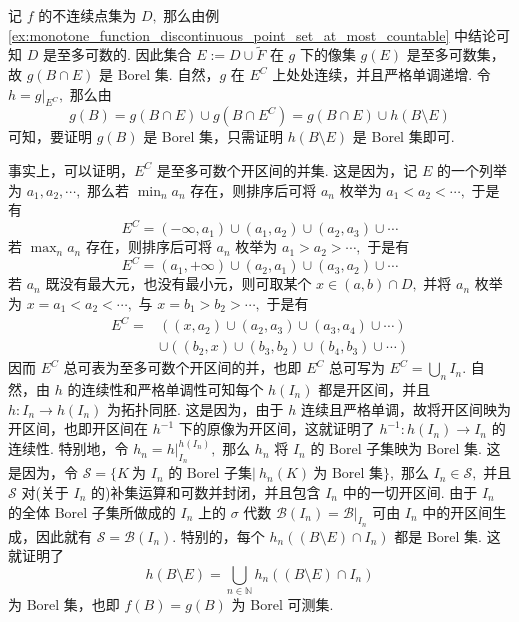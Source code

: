\documentclass[12pt, a4paper, oneside]{book}
\numberwithin{figure}{section}
\theoremstyle{definition}
\begin{document}
记 $f$ 的不连续点集为 $D,$ 那么由例 \ref{ex:monotone_function_discontinuous_point_set_at_most_countable} 中结论可知 $D$ 是至多可数的. 
因此集合 $E:=D\cup \tilde F$ 在 $g$ 下的像集 $g(E)$ 是至多可数集，故 $g(B\cap E)$ 是 Borel 集. 自然，$g$ 在 $E^C$ 上处处连续，并且严格单调递增. 令 $h=g|_{E^C},$ 那么由
\begin{equation}
    g(B) = g(B\cap E)\cup g(B\cap E^C) = g(B\cap E)\cup h(B\setminus E)
\end{equation}
可知，要证明 $g(B)$ 是 Borel 集，只需证明 $h(B\setminus E)$ 是 Borel 集即可. 

事实上，可以证明，$E^C$ 是至多可数个开区间的并集. 这是因为，记 $E$ 的一个列举为 $a_1,a_2,\cdots,$ 那么若 
$\min_n a_n$ 存在，则排序后可将 $a_n$ 枚举为 $a_1<a_2<\cdots,$ 于是有 
\begin{equation}
    E^C =  (-\infty,a_1)\cup (a_1,a_2)\cup (a_2,a_3)\cup \cdots
\end{equation}
若 $\max_n a_n$ 存在，则排序后可将 $a_n$ 枚举为 $a_1>a_2>\cdots,$ 于是有
\begin{equation}
    E^C =  (a_1,+\infty)\cup (a_2,a_1)\cup (a_3,a_2)\cup\cdots
\end{equation}
若 $a_n$ 既没有最大元，也没有最小元，则可取某个 $x\in (a,b)\cap D,$ 并将 $a_n$ 枚举为 $x=a_1<a_2<\cdots,$ 与 $x=b_1>b_2>\cdots,$ 于是有
\begin{equation}
    \begin{aligned}
        E^C =& \left( (x,a_2)\cup (a_2,a_3)\cup (a_3,a_4)\cup\cdots\right) \\
        &\cup \left( (b_2,x)\cup (b_3,b_2)\cup (b_4,b_3)\cup\cdots\right)
    \end{aligned}
\end{equation}
因而 $E^C$ 总可表为至多可数个开区间的并，也即 $E^C$ 总可写为 $E^C=\bigcup_n I_n.$ 自然，由 $h$ 的连续性和严格单调性可知每个 $h(I_n)$ 都是开区间，并且 $h:I_n\to h(I_n)$ 为拓扑同胚. 这是因为，由于 $h$ 连续且严格单调，故将开区间映为开区间，也即开区间在 $h^{-1}$ 下的原像为开区间，这就证明了 $h^{-1}:h(I_n)\to I_n$ 的连续性. 
特别地，令 $h_n=h|_{I_n}^{h(I_n)},$ 那么 $h_n$ 将 $I_n$ 的 Borel 子集映为 Borel 集. 这是因为，令
$\mathcal S=\{K\ \text{为 $I_n$ 的 Borel 子集}|\ h_n(K)\ \text{为 Borel 集}\},$ 那么 $I_n\in\mathcal S,$ 并且 $\mathcal S$ 对(关于 $I_n$ 的)补集运算和可数并封闭，并且包含 $I_n$ 中的一切开区间. 由于 $I_n$ 的全体 Borel 子集所做成的 $I_n$ 上的 $\sigma$ 代数 $\mathcal B(I_n)=\mathcal B|_{I_n}$ 可由 $I_n$ 中的开区间生成，因此就有 $\mathcal S=\mathcal B(I_n).$ 
特别的，每个 $h_n((B\setminus E)\cap I_n)$ 都是 Borel 集. 这就证明了 
\begin{equation}
    h(B\setminus E) = \bigcup_{n\in\mathbb N} h_n((B\setminus E)\cap I_n)
\end{equation}
为 Borel 集，也即 $f(B)=g(B)$ 为 Borel 可测集.
\end{document}

